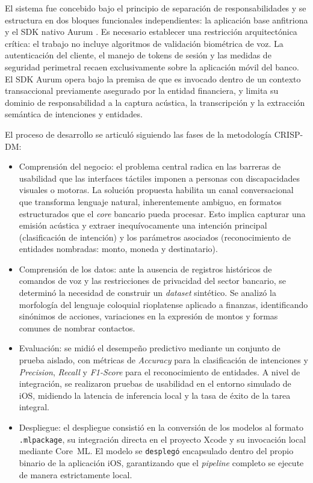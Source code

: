 El sistema fue concebido bajo el principio de separación de responsabilidades y se estructura en dos bloques funcionales independientes: la aplicación base anfitriona y el SDK nativo Aurum \citep{apple2026frameworks}. Es necesario establecer una restricción arquitectónica crítica: el trabajo no incluye algoritmos de validación biométrica de voz. La autenticación del cliente, el manejo de tokens de sesión y las medidas de seguridad perimetral recaen exclusivamente sobre la aplicación móvil del banco. El SDK Aurum opera bajo la premisa de que es invocado dentro de un contexto transaccional previamente asegurado por la entidad financiera, y limita su dominio de responsabilidad a la captura acústica, la transcripción y la extracción semántica de intenciones y entidades.

El proceso de desarrollo se articuló siguiendo las fases de la metodología CRISP-DM:

\begin{itemize}
	\item Comprensión del negocio: el problema central radica en las barreras de usabilidad que las interfaces táctiles imponen a personas con discapacidades visuales o motoras. La solución propuesta habilita un canal conversacional que transforma lenguaje natural, inherentemente ambiguo, en formatos estructurados que el \textit{core} bancario pueda procesar. Esto implica capturar una emisión acústica y extraer inequívocamente una intención principal (clasificación de intención) y los parámetros asociados (reconocimiento de entidades nombradas: monto, moneda y destinatario).

	\item Comprensión de los datos: ante la ausencia de registros históricos de comandos de voz y las restricciones de privacidad del sector bancario, se determinó la necesidad de construir un \textit{dataset} sintético. Se analizó la morfología del lenguaje coloquial rioplatense aplicado a finanzas, identificando sinónimos de acciones, variaciones en la expresión de montos y formas comunes de nombrar contactos.

	\item Evaluación: se midió el desempeño predictivo mediante un conjunto de prueba aislado, con métricas de \textit{Accuracy} para la clasificación de intenciones y \textit{Precision}, \textit{Recall} y \textit{F1-Score} para el reconocimiento de entidades. A nivel de integración, se realizaron pruebas de usabilidad en el entorno simulado de iOS, midiendo la latencia de inferencia local y la tasa de éxito de la tarea integral.

	\item Despliegue: el despliegue consistió en la conversión de los modelos al formato \lstinline|.mlpackage|, su integración directa en el proyecto Xcode y su invocación local mediante Core~ML. El modelo se \texttt{desplegó} encapsulado dentro del propio binario de la aplicación iOS, garantizando que el \textit{pipeline} completo se ejecute de manera estrictamente local.
\end{itemize}

